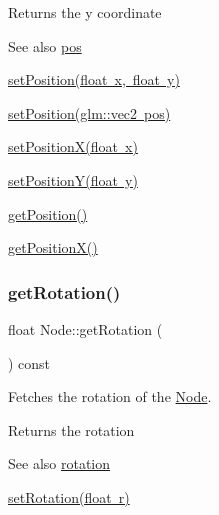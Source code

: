 \begin{DoxyReturn}{Returns}
the y coordinate 
\end{DoxyReturn}
\begin{DoxySeeAlso}{See also}
\mbox{\hyperlink{classsage_1_1Node_a7e0ae6eeb84fae60e54e6685c982b0b2}{pos}} 

\mbox{\hyperlink{classsage_1_1Node_aaa8545c103ef1b35e5076dbedab93af5}{set\+Position(float x, float y)}} 

\mbox{\hyperlink{classsage_1_1Node_ae2731cefe38e706c2bf21afae6da18b3}{set\+Position(glm\+::vec2 pos)}} 

\mbox{\hyperlink{classsage_1_1Node_ae1dfc73d6122a95778d5d9db3d1fd913}{set\+Position\+X(float x)}} 

\mbox{\hyperlink{classsage_1_1Node_a5c97d36655f0daa71a5f6c715d2b0470}{set\+Position\+Y(float y)}} 

\mbox{\hyperlink{classsage_1_1Node_a67eb5862f4da3cc4b2219a7e555a5678}{get\+Position()}} 

\mbox{\hyperlink{classsage_1_1Node_a17e92da5beaeb4b299c4e93729a22b1a}{get\+Position\+X()}} 
\end{DoxySeeAlso}
\mbox{\label{classsage_1_1Node_aca7139bc3ea6705d41bb65a4fb7ddb6c}} 
\subsubsection{\texorpdfstring{getRotation()}{getRotation()}}
{\footnotesize\ttfamily float Node\+::get\+Rotation (\begin{DoxyParamCaption}{ }\end{DoxyParamCaption}) const}



Fetches the rotation of the \mbox{\hyperlink{classsage_1_1Node}{Node}}. 

\begin{DoxyReturn}{Returns}
the rotation 
\end{DoxyReturn}
\begin{DoxySeeAlso}{See also}
\mbox{\hyperlink{classsage_1_1Node_ae83b239ad4c722fee62708977e0560f4}{rotation}} 

\mbox{\hyperlink{classsage_1_1Node_a422e877f5a830ad4d50b8e13250ee553}{set\+Rotation(float r)}} 
\end{DoxySeeAlso}
\mbox{\label{classsage_1_1Node_af1a9bc0715acbc80623b5a15a5f65f3f}} 
